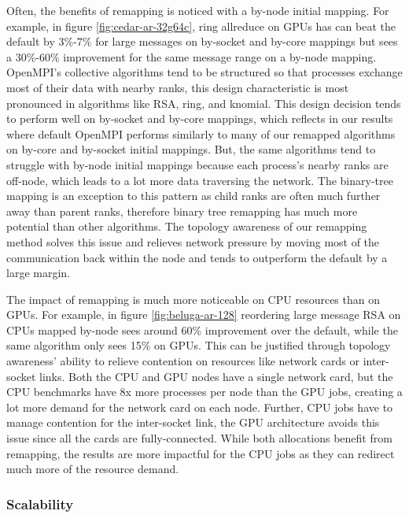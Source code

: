 Often, the benefits of remapping is noticed with a by-node initial mapping. 
For example, in figure \ref{fig:cedar-ar-32g64c}, ring allreduce on GPUs has can beat the default by 3\%-7\% for large messages on by-socket and by-core mappings but sees a 30\%-60\% improvement for the same message range on a by-node mapping.
OpenMPI's collective algorithms tend to be structured so that processes exchange most of their data with nearby ranks, this design characteristic is most pronounced in algorithms like RSA, ring, and knomial.
This design decision tends to perform well on by-socket and by-core mappings, which reflects in our results where default OpenMPI performs similarly to many of our remapped algorithms on by-core and by-socket initial mappings.
But, the same algorithms tend to struggle with by-node initial mappings because each process's nearby ranks are off-node, which leads to a lot more data traversing the network.
The binary-tree mapping is an exception to this pattern as child ranks are often much further away than parent ranks, therefore binary tree remapping has much more potential than other algorithms.
The topology awareness of our remapping method solves this issue and relieves network pressure by moving most of the communication back within the node and tends to outperform the default by a large margin.

The impact of remapping is much more noticeable on CPU resources than on GPUs.
For example, in figure \ref{fig:beluga-ar-128} reordering large message RSA on CPUs mapped by-node sees around 60\% improvement over the default, while the same algorithm only sees 15\% on GPUs.
This can be justified through topology awareness' ability to relieve contention on resources like network cards or inter-socket links. 
Both the CPU and GPU nodes have a single network card, but the CPU benchmarks have 8x more processes per node than the GPU jobs, creating a lot more demand for the network card on each node.
Further, CPU jobs have to manage contention for the inter-socket link, the GPU architecture avoids this issue since all the cards are fully-connected.
While both allocations benefit from remapping, the results are more impactful for the CPU jobs as they can redirect much more of the resource demand.

\subsubsection{Scalability}



